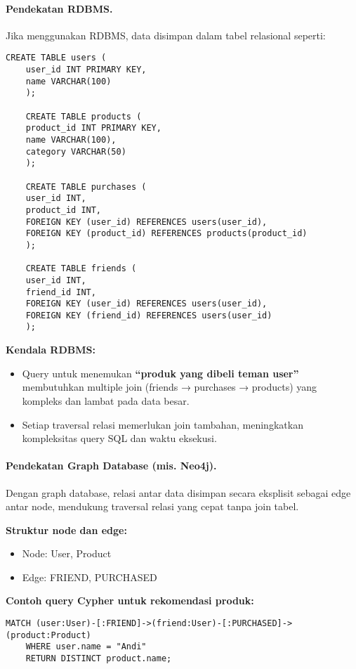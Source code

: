 \paragraph{Pendekatan RDBMS.}

Jika menggunakan RDBMS, data disimpan dalam tabel relasional seperti:

\begin{lstlisting}[style=SqlStyle]
	CREATE TABLE users (
	user_id INT PRIMARY KEY,
	name VARCHAR(100)
	);
	
	CREATE TABLE products (
	product_id INT PRIMARY KEY,
	name VARCHAR(100),
	category VARCHAR(50)
	);
	
	CREATE TABLE purchases (
	user_id INT,
	product_id INT,
	FOREIGN KEY (user_id) REFERENCES users(user_id),
	FOREIGN KEY (product_id) REFERENCES products(product_id)
	);
	
	CREATE TABLE friends (
	user_id INT,
	friend_id INT,
	FOREIGN KEY (user_id) REFERENCES users(user_id),
	FOREIGN KEY (friend_id) REFERENCES users(user_id)
	);
\end{lstlisting}

\textbf{Kendala RDBMS:}
\begin{itemize}
	\item Query untuk menemukan \textbf{“produk yang dibeli teman user”} membutuhkan multiple join (friends → purchases → products) yang kompleks dan lambat pada data besar.
	\item Setiap traversal relasi memerlukan join tambahan, meningkatkan kompleksitas query SQL dan waktu eksekusi.
\end{itemize}

\paragraph{Pendekatan Graph Database (mis. Neo4j).}

Dengan graph database, relasi antar data disimpan secara eksplisit sebagai edge antar node, mendukung traversal relasi yang cepat tanpa join tabel.

\textbf{Struktur node dan edge:}
\begin{itemize}
	\item Node: User, Product
	\item Edge: FRIEND, PURCHASED
\end{itemize}

\textbf{Contoh query Cypher untuk rekomendasi produk:}

\begin{lstlisting}[style=SqlStyle]
	MATCH (user:User)-[:FRIEND]->(friend:User)-[:PURCHASED]->(product:Product)
	WHERE user.name = "Andi"
	RETURN DISTINCT product.name;
\end{lstlisting}

